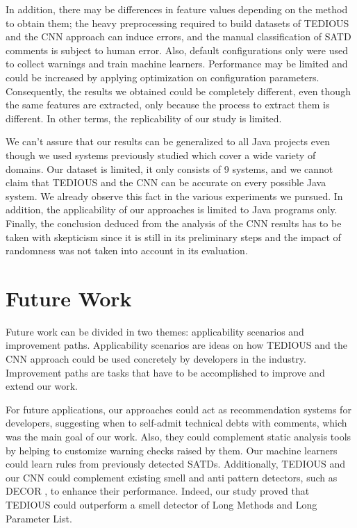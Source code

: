 In addition, there may be differences in feature values depending on the method to obtain them; the heavy preprocessing required to build datasets of TEDIOUS and the CNN approach can induce errors, and the manual classification of SATD comments is subject to human error. Also, default configurations only were used to collect warnings and train machine learners. Performance may be limited and could be increased by applying optimization on configuration parameters. Consequently, the results we obtained could be completely different, even though the same features are extracted, only because the process to extract them is different. In other terms, the replicability of our study is limited.

We can't assure that our results can be generalized to all Java projects even though we used systems previously studied \citep{maldonado17} which cover a wide variety of domains. Our dataset is limited, it only consists of 9 systems, and we cannot claim that TEDIOUS and the CNN can be accurate on every possible Java system. We already observe this fact in the various experiments we pursued. In addition, the applicability of our approaches is limited to Java programs only. Finally, the conclusion deduced from the analysis of the CNN results has to be taken with skepticism since it is still in its preliminary steps and the impact of randomness was not taken into account in its evaluation.

\section{Future Work}


Future work can be divided in two themes: applicability scenarios and improvement paths. Applicability scenarios are ideas on how TEDIOUS and the CNN approach could be used concretely by developers in the industry. Improvement paths are tasks that have to be accomplished to improve and extend our work.

For future applications, our approaches could act as recommendation systems for developers, suggesting when to self-admit technical debts with comments, which was the main goal of our work. Also, they could complement static analysis tools by helping to customize warning checks raised by them. Our machine learners could learn rules from previously detected SATDs. Additionally, TEDIOUS and our CNN could complement existing smell and anti pattern detectors, such as DECOR \citep{moha2010decor}, to enhance their performance. Indeed, our study proved that TEDIOUS could outperform a smell detector of Long Methods and Long Parameter List.


